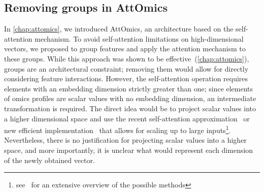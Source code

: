 \documentclass[../main.tex]{subfiles}
\begin{document}
	\subsection{Removing groups in AttOmics}\label{sec:scalar_attention}
		In \cref{chap:attomics}, we introduced AttOmics, an architecture based on the self-attention mechanism.
		To avoid self-attention limitations on high-dimensional vectors, we proposed to group features and apply the attention mechanism to these groups.
		While this approach was shown to be effective~(\cref{chap:attomics}), groups are an architectural constraint; removing them would allow for directly considering feature interactions.
		However, the self-attention operation requires elements with an embedding dimension strictly greater than one; since elements of omics profiles are scalar values with no embedding dimension, an intermediate transformation is required.
		The direct idea would be to project scalar values into a higher dimensional space and use the recent self-attention approximation~\cite{xiongNystrOmformerNystr2021,Linformer} or new efficient implementation~\cite{FlashAttention,rabeSelfattentionDoesNot2021,bolyaHydraAttentionEfficient2022a} that allows for scaling up to large inputs\footnote{see~\cite{EfficientTransformers} for an extensive overview of the possible methods}.
		Nevertheless, there is no justification for projecting scalar values into a higher space, and more importantly, it is unclear what would represent each dimension of the newly obtained vector.
\end{document}
